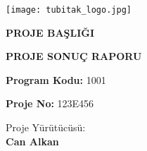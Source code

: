 \documentclass[11pt]{article}
\begin{document}
\pagestyle{fancy}
   \lhead{}\rhead{}
   \lfoot{\textcolor{light-gray}{\small Proje Sonuç Raporu}}
        \cfoot{{\thepage}}
        \rfoot{}
  \renewcommand{\headrulewidth}{0pt}

\label{coverpage}

\renewcommand{\figurename}{\bf Şekil}
\renewcommand{\tablename}{\bf Tablo}
\renewcommand{\contentsname}{İçindekiler}
\renewcommand{\refname}{Referanslar}
\renewcommand{\listfigurename}{Şekiller}
\renewcommand{\listtablename}{Tablolar}

\newpage
\phantom{22}
\vspace{-3cm}



\begin{center}
\texttt{[image: tubitak\_logo.jpg]}

\bigskip
\bigskip


\bigskip
{\fontsize{15}{10}\selectfont 
\bigskip


\bigskip
\medskip
{ \textbf{\Huge PROJE BAŞLIĞI \\}}}


\bigskip
\medskip
{ \textbf{ PROJE SONUÇ RAPORU}}
\bigskip





\end{center}


\bigskip

\bigskip


\thispagestyle{empty}


\begin{center}
\medskip
{\LARGE \textbf{Program Kodu:} 1001}

\bigskip
{\LARGE \textbf{Proje No:} 123E456}

\bigskip
{\LARGE Proje Yürütücüsü:\\
\textbf{Can Alkan}}

\end{center}
\end{document}
